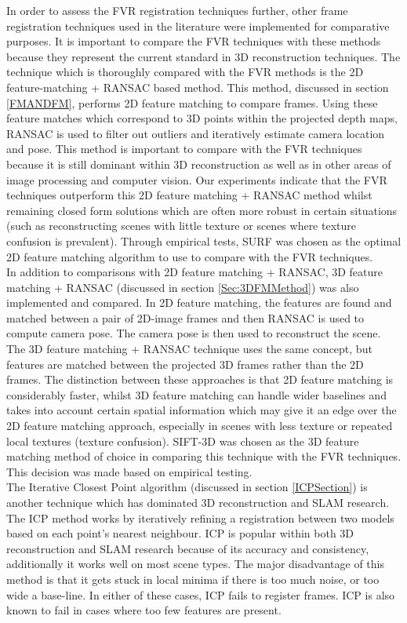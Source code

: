 
In order to assess the FVR registration techniques further, other frame registration techniques used in the literature were implemented for comparative purposes. It is important to compare the FVR techniques with these methods because they represent the current standard in 3D reconstruction techniques. The technique which is thoroughly compared with the FVR methods is the 2D feature-matching + RANSAC based method. This method, discussed in section \ref{FMANDFM}, performs 2D feature matching to compare frames. Using these feature matches which correspond to 3D points within the projected depth maps, RANSAC is used to filter out outliers and iteratively estimate camera location and pose. This method is important to compare with the FVR techniques because it is still dominant within 3D reconstruction as well as in other areas of image processing and computer vision. Our experiments indicate that the FVR techniques outperform this 2D feature matching + RANSAC method whilst remaining closed form solutions which are often more robust in certain situations (such as reconstructing scenes with little texture or scenes where texture confusion is prevalent). Through empirical tests, SURF was chosen as the optimal 2D feature matching algorithm to use to compare with the FVR techniques. \\ 


In addition to comparisons with 2D feature matching + RANSAC, 3D feature matching + RANSAC (discussed in section \ref{Sec:3DFMMethod}) was also implemented and compared. In 2D feature matching, the features are found and matched between a pair of 2D-image frames and then RANSAC is used to compute camera pose. The camera pose is then used to reconstruct the scene. The 3D feature matching + RANSAC technique uses the same concept, but features are matched between the projected 3D frames rather than the 2D frames. The distinction between these approaches is that 2D feature matching is considerably faster, whilst 3D feature matching can handle wider baselines and takes into account certain spatial information which may give it an edge over the 2D feature matching approach, especially in scenes with less texture or repeated local textures (texture confusion). SIFT-3D was chosen as the 3D feature matching method of choice in comparing this technique with the FVR techniques. This decision was made based on empirical testing. \\

The Iterative Closest Point algorithm (discussed in section \ref{ICPSection}) is another technique which has dominated 3D reconstruction and SLAM research. The ICP method works by iteratively refining a registration between two models based on each point's nearest neighbour. ICP is popular within both 3D reconstruction and SLAM research because of its accuracy and consistency, additionally it works well on most scene types. The major disadvantage of this method is that it gets stuck in local minima if there is too much noise, or too wide a base-line. In either of these cases, ICP fails to register frames. ICP is also known to fail in cases where too few features are present. \\

